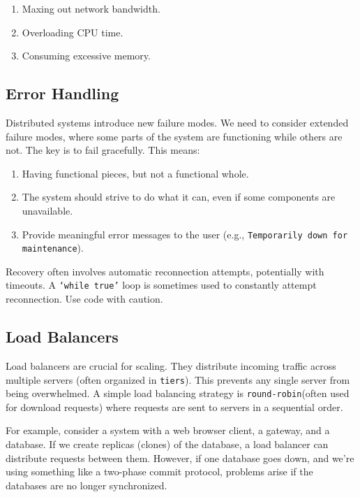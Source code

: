 \begin{enumerate}[label=\roman*),noitemsep,topsep=4pt]
\item Maxing out network bandwidth.
\item Overloading CPU time.
\item Consuming excessive memory.
\end{enumerate}

\subsection{Error Handling}

Distributed systems introduce new failure modes. We need to consider extended failure modes, where some parts of the system are functioning while others are not. The key is to fail gracefully. This means:

\begin{enumerate}[label=\roman*),noitemsep, topsep=2pt]
\item Having functional pieces, but not a functional whole.
\item The system should strive to do what it can, even if some components are unavailable.
\item Provide meaningful error messages to the user (e.g., \texttt{Temporarily down for maintenance}).
\end{enumerate}

Recovery often involves automatic reconnection attempts, potentially with timeouts. A \texttt{`while true'} loop is sometimes used to constantly attempt reconnection.
Use code with caution.
\subsection{Load Balancers}

Load balancers are crucial for scaling. They distribute incoming traffic across multiple servers (often organized in \texttt{tiers}). This prevents any single server from being overwhelmed. A simple load balancing strategy is \texttt{round-robin}(often used for download requests) where requests are sent to servers in a sequential order.

For example, consider a system with a web browser client, a gateway, and a database. If we create replicas (clones) of the database, a load balancer can distribute requests between them. However, if one database goes down, and we're using something like a two-phase commit protocol, problems arise if the databases are no longer synchronized.

